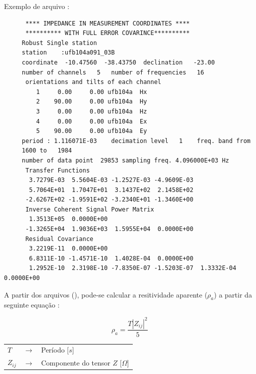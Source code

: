        Exemplo de arquivo :
        
\begin{footnotesize}        
\begin{verbatim}
      **** IMPEDANCE IN MEASUREMENT COORDINATES ****
      ********** WITH FULL ERROR COVARINCE**********
     Robust Single station                                                           
     station    :ufb104a091_03B      
     coordinate  -10.47560  -38.43750  declination   -23.00
     number of channels   5   number of frequencies   16
      orientations and tilts of each channel 
         1     0.00     0.00 ufb104a  Hx    
         2    90.00     0.00 ufb104a  Hy    
         3     0.00     0.00 ufb104a  Hz    
         4     0.00     0.00 ufb104a  Ex    
         5    90.00     0.00 ufb104a  Ey    
     period : 1.116071E-03    decimation level   1    freq. band from
     1600 to   1984
     number of data point  29853 sampling freq. 4.096000E+03 Hz
      Transfer Functions
       3.7279E-03  5.5604E-03 -1.2527E-03 -4.9609E-03
       5.7064E+01  1.7047E+01  3.1437E+02  2.1458E+02
      -2.6267E+02 -1.9591E+02 -3.2340E+01 -1.3460E+00
      Inverse Coherent Signal Power Matrix
       1.3513E+05  0.0000E+00
      -1.3265E+04  1.9036E+03  1.5955E+04  0.0000E+00
      Residual Covariance
       3.2219E-11  0.0000E+00
       6.8311E-10 -1.4571E-10  1.4028E-04  0.0000E+00
       1.2952E-10  2.3198E-10 -7.8350E-07 -1.5203E-07  1.3332E-04  0.0000E+00                                     
\end{verbatim}
\end{footnotesize}
        
        A partir dos arquivos  (), pode-se calcular a resitividade aparente ($\rho_a$) a partir da seguinte equação \cite{z-files}:
        
        \begin{equation}
         \rho_a = \dfrac{T|Z_{ij}|^2}{5}
        \end{equation}

        {\footnotesize \noindent
            \begin{table}[H]
                \begin{tabular*}{1cm}{p{0.05cm}p{0.1cm}p{10cm}}
                    {\footnotesize $T$}          & {\footnotesize $\rightarrow$} & {\footnotesize Período [$s$] }\\
                    {\footnotesize $Z_{ij}$}  & {\footnotesize $\rightarrow$} & {\footnotesize Componente do tensor $Z$ [$\Omega$] }\\
                \end{tabular*}
            \end{table}}
        
